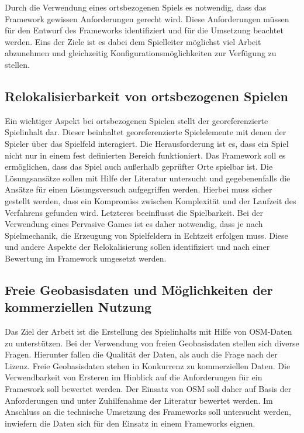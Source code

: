 Durch die Verwendung eines ortsbezogenen Spiels es notwendig, dass das Framework gewissen Anforderungen gerecht wird.
Diese Anforderungen müssen für den Entwurf des Frameworks identifiziert und für die Umsetzung beachtet werden.
Eins der Ziele ist es dabei dem Spielleiter möglichst viel Arbeit abzunehmen und gleichzeitig Konfigurationsmöglichkeiten zur Verfügung zu stellen.

\subsection*{Relokalisierbarkeit von ortsbezogenen Spielen}

Ein wichtiger Aspekt bei ortsbezogenen Spielen stellt der georeferenzierte Spielinhalt dar. Dieser beinhaltet georeferenzierte Spielelemente mit denen der Spieler über das Spielfeld interagiert.
Die Herausforderung ist es, dass ein Spiel nicht nur in einem fest definierten Bereich funktioniert. Das Framework soll es ermöglichen, dass das Spiel auch außerhalb geprüfter Orte spielbar ist.
Die Lösungsansätze sollen mit Hilfe der Literatur untersucht und gegebenenfalls die Ansätze für einen Lösungsversuch aufgegriffen werden.
Hierbei muss sicher gestellt werden, dass ein Kompromiss zwischen Komplexität und der Laufzeit des Verfahrens gefunden wird. Letzteres beeinflusst die Spielbarkeit.
Bei der Verwendung eines Pervasive Games ist es daher notwendig, dass je nach Spielmechanik, die Erzeugung von Spielfeldern in Echtzeit erfolgen muss.
Diese und andere Aspekte der Relokalisierung sollen identifiziert und nach einer Bewertung im Framework umgesetzt werden.

\subsection*{Freie Geobasisdaten und Möglichkeiten der kommerziellen Nutzung}

Das Ziel der Arbeit ist die Erstellung des Spielinhalts mit Hilfe von OSM-Daten zu unterstützen.
Bei der Verwendung von freien Geobasisdaten stellen sich diverse Fragen. Hierunter fallen die Qualität der Daten, als auch die Frage nach der Lizenz.
Freie Geobasisdaten stehen in Konkurrenz zu kommerziellen Daten. Die Verwendbarkeit von Ersteren im Hinblick auf die Anforderungen für ein Framework soll bewertet werden.
Der Einsatz von OSM soll daher auf Basis der Anforderungen und unter Zuhilfenahme der Literatur bewertet werden. Im Anschluss an die technische Umsetzung des Frameworks soll untersucht werden, inwiefern die Daten sich für den Einsatz in einem Frameworks eignen.
